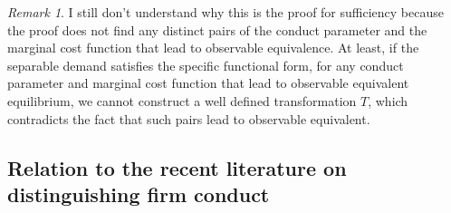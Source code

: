 \documentclass[11pt, a4paper]{article}
\theoremstyle{remark}
\newtheorem{remark}{Remark}
\begin{document}
\iffalse

\begin{remark}
    I still don't understand why this is the proof for sufficiency because the proof does not find any distinct pairs of the conduct parameter and the marginal cost function that lead to observable equivalence.
    At least, if the separable demand satisfies the specific functional form, for any conduct parameter and marginal cost function that lead to observable equivalent equilibrium, we cannot construct a well defined transformation $T$, which contradicts the fact that such pairs lead to observable equivalent.
\end{remark}
















\subsection{Relation to the recent literature on distinguishing firm conduct}
\end{document}
